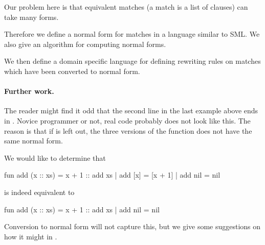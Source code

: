 Our problem here is that equivalent matches (a match is a list of clauses) can
take many forms.

Therefore we define a normal form for matches in a language similar to SML. We
also give an algorithm for computing normal forms.

We then define a domain specific language for defining rewriting rules on
matches which have been converted to normal form.

\paragraph{Further work.}
The reader might find it odd that the second line in the last example above ends
in . Novice programmer or not, real code probably does not
look like this. The reason is that if  is left out, the three
versions of the function  does not have the same normal form.

We would like to determine that
\begin{sml}
fun add (x :: xs) = x + 1 :: add xs
  | add [x]       = [x + 1]
  | add nil       = nil
\end{sml}
is indeed equivalent to
\begin{sml}
fun add (x :: xs) = x + 1 :: add xs
  | add nil       = nil
\end{sml}
Conversion to normal form will not capture this, but we give some suggestions on
how it might in .





